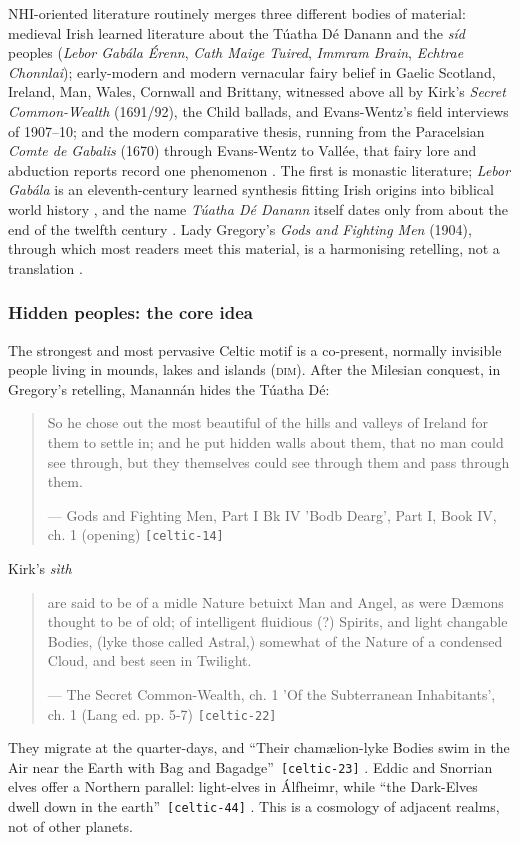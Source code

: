 \documentclass[11pt,a4paper]{article}
\newcommand{\pid}[1]{\texttt{\small #1}}
\begin{document}
NHI-oriented literature routinely merges three different bodies of material: medieval Irish learned literature about the Túatha Dé Danann and the \emph{síd} peoples (\emph{Lebor Gabála Érenn}, \emph{Cath Maige Tuired}, \emph{Immram Brain}, \emph{Echtrae Chonnlai}); early-modern and modern vernacular fairy belief in Gaelic Scotland, Ireland, Man, Wales, Cornwall and Brittany, witnessed above all by Kirk's \emph{Secret Common-Wealth} (1691/92), the Child ballads, and Evans-Wentz's field interviews of 1907--10; and the modern comparative thesis, running from the Paracelsian \emph{Comte de Gabalis} (1670) through Evans-Wentz to Vallée, that fairy lore and abduction reports record one phenomenon \parencite{macalister1941lge,gray1982cmt,meyer1895,kirk1893,child1882,evanswentz1911,villars1670,vallee1969}. The first is monastic literature; \emph{Lebor Gabála} is an eleventh-century learned synthesis fitting Irish origins into biblical world history \parencite{carey1994}, and the name \emph{Túatha Dé Danann} itself dates only from about the end of the twelfth century \parencite{williams2016}. Lady Gregory's \emph{Gods and Fighting Men} (1904), through which most readers meet this material, is a harmonising retelling, not a translation \parencite{gregory1904}.

\subsubsection{Hidden peoples: the core idea}

The strongest and most pervasive Celtic motif is a co-present, normally invisible people living in mounds, lakes and islands (\textsc{dim}). After the Milesian conquest, in Gregory's retelling, Manannán hides the Túatha Dé: 
\begin{quote}\small So he chose out the most beautiful of the hills and valleys of Ireland for them to settle in; and he put hidden walls about them, that no man could see through, but they themselves could see through them and pass through them.\par\hfill{\footnotesize --- Gods and Fighting Men, Part I Bk IV 'Bodb Dearg', Part I, Book IV, ch. 1 (opening) \pid{[celtic-14]}}\end{quote}
 Kirk's \emph{sìth} 
\begin{quote}\small are said to be of a midle Nature betuixt Man and Angel, as were Dæmons thought to be of old; of intelligent fluidious (?) Spirits, and light changable Bodies, (lyke those called Astral,) somewhat of the Nature of a condensed Cloud, and best seen in Twilight.\par\hfill{\footnotesize --- The Secret Common-Wealth, ch. 1 'Of the Subterranean Inhabitants', ch. 1 (Lang ed. pp. 5-7) \pid{[celtic-22]}}\end{quote}
 They migrate at the quarter-days, and \enquote{Their chamælion-lyke Bodies swim in the Air near the Earth with Bag and Bagadge}~\pid{[celtic-23]} \parencite{kirk1893}. Eddic and Snorrian elves offer a Northern parallel: light-elves in Álfheimr, while \enquote{the Dark-Elves dwell down in the earth}~\pid{[celtic-44]} \parencite{brodeur1916}. This is a cosmology of adjacent realms, not of other planets.
\end{document}
